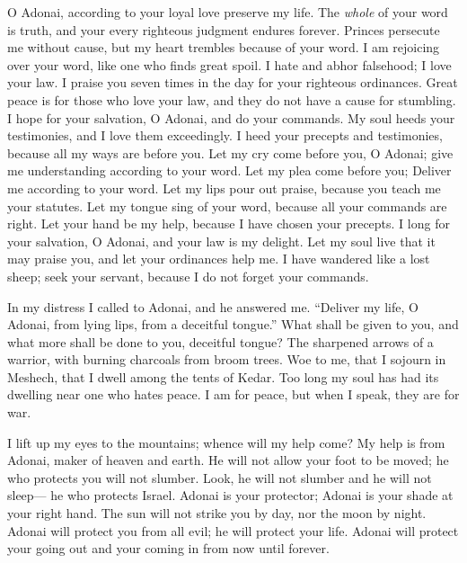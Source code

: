 \begin{biblechapter}
O Adonai, according to your loyal love preserve my life.
\verse The \textit{whole} of your word is truth, 
and your every righteous judgment endures forever.
 Princes persecute me without cause, 
but my heart trembles because of your word.
\verse I am rejoicing over your word, 
like one who finds great spoil.
\verse I hate and abhor falsehood; 
I love your law.
\verse I praise you seven times in the day 
for your righteous ordinances.
\verse Great peace is for those who love your law, 
and they do not have a cause for stumbling.
\verse I hope for your salvation, O Adonai, 
and do your commands.
\verse My soul heeds your testimonies, 
and I love them exceedingly.
\verse I heed your precepts and testimonies, 
because all my ways are before you.
 Let my cry come before you, O Adonai; 
give me understanding according to your word.
\verse Let my plea come before you; 
Deliver me according to your word.
\verse Let my lips pour out praise, 
because you teach me your statutes.
\verse Let my tongue sing of your word, 
because all your commands are right.
\verse Let your hand be my help, 
because I have chosen your precepts.
\verse I long for your salvation, O Adonai, 
and your law is my delight.
\verse Let my soul live that it may praise you, 
and let your ordinances help me.
\verse I have wandered like a lost sheep; seek your servant, 
because I do not forget your commands.
\end{biblechapter}

\begin{biblechapter} %
 In my distress I called to Adonai, 
and he answered me.
\verse “Deliver my life, O Adonai, from lying lips, 
from a deceitful tongue.”
\verse What shall be given to you, 
and what more shall be done to you, 
deceitful tongue?
\verse The sharpened arrows of a warrior, 
with burning charcoals from broom trees.
\verse Woe to me, that I sojourn in Meshech, 
that I dwell among the tents of Kedar.
\verse Too long my soul has had its dwelling 
near one who hates peace.
\verse I am for peace, but when I speak, 
they are for war.
\end{biblechapter}

\begin{biblechapter} %
 I lift up my eyes to the mountains; 
whence will my help come?
\verse My help is from Adonai, 
maker of heaven and earth.
\verse He will not allow your foot to be moved; 
he who protects you will not slumber.
\verse Look, he will not slumber and he will not sleep— 
he who protects Israel.
\verse Adonai is your protector; 
Adonai is your shade at your right hand.
\verse The sun will not strike you by day, 
nor the moon by night.
\verse Adonai will protect you from all evil; 
he will protect your life.
\verse Adonai will protect your going out and your coming in 
from now until forever.
\end{biblechapter}

